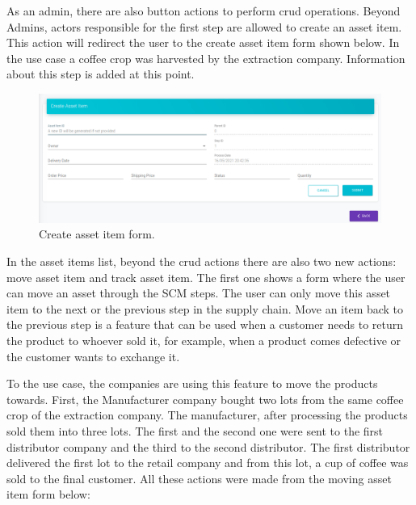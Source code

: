 As an admin, there are also button actions to perform crud operations. Beyond Admins, actors responsible for the first step are allowed to create an asset item. This action will redirect the user to the create asset item form shown below. In the use case a coffee crop was harvested by the extraction company. Information about this step is added at this point. 

\begin{figure}[H]
\begin{center}
  \includegraphics[scale=0.34]{images/use_example/09_create_asset_Item.png}
\caption{Create asset item form.}
\label{fig:create_asset_item}
\end{center}
\end{figure}


In the asset items list, beyond the crud actions there are also two new actions: move asset item and track asset item. The first one shows a form where the user can move an asset through the SCM steps. The user can only move this asset item to the next or the previous step in the supply chain. Move an item back to the previous step is a feature that can be used when a customer needs to return the product to whoever sold it, for example, when a product comes defective or the customer wants to exchange it. 

To the use case, the companies are using this feature to move the products towards. First, the Manufacturer company bought two lots from the same coffee crop of the extraction company. The manufacturer, after processing the products sold them into three lots. The first and the second one were sent to the first distributor company and the third to the second distributor. The first distributor delivered the first lot to the retail company and from this lot, a cup of coffee was sold to the final customer. All these actions were made from the moving asset item form below:

